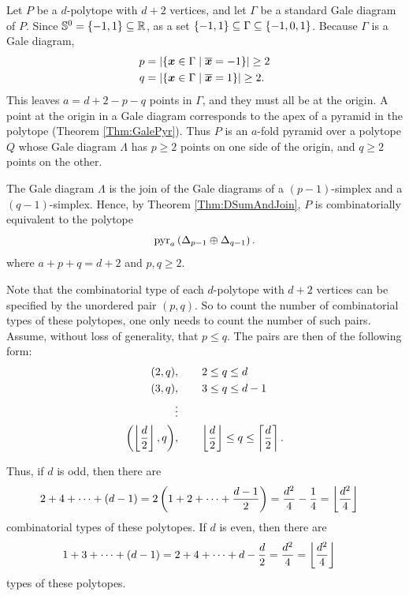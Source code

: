     Let \(P\) be a \(d\)-polytope with \(d+2\) vertices, and let \(\Gamma\) be a standard Gale diagram of \(P\).  Since \(\mathbb{S}^{0}=\left\{-1,1\right\}\subseteq\mathbb{R}\), as a set \(\left\{-1,1\right\}\subseteq\Gamma\subseteq\left\{-1,0,1\right\}\).  Because \(\Gamma\) is a Gale diagram,
        \begin{align*}
            p
                &=  \card{\setb{\ve x\in\Gamma}{\ol{\ve x}=-1}}
                    \ge 2\\
            q
                &=  \card{\setb{\ve x\in\Gamma}{\ol{\ve x}=1}}
                    \ge 2.
        \end{align*}
    This leaves \(a=d+2-p-q\) points in \(\Gamma\), and they must all be at the origin.  A point at the origin in a Gale diagram corresponds to the apex of a pyramid in the polytope (Theorem \ref{Thm:GalePyr}).  Thus \(P\) is an \(a\)-fold pyramid over a polytope \(Q\) whose Gale diagram \(\Lambda\) has \(p\ge 2\) points on one side of the origin, and \(q\ge 2\) points on the other.

    The Gale diagram \(\Lambda\) is the join of the Gale diagrams of a \((p-1)\)-simplex and a \((q-1)\)-simplex.  Hence, by Theorem \ref{Thm:DSumAndJoin}, \(P\) is combinatorially equivalent to the polytope
        \[
            \operatorname{pyr}_a\left(\Delta_{p-1}\oplus\Delta_{q-1}\right).
        \]
    where \(a+p+q=d+2\) and \(p,q\ge 2\).

    Note that the combinatorial type of each \(d\)-polytope with \(d+2\) vertices can be specified by the unordered pair \((p,q)\).  So to count the number of combinatorial types of these polytopes, one only needs to count the number of such pairs.  Assume, without loss of generality, that \(p\le q\).  The pairs are then of the following form:
        \begin{align*}
            (2,q)
                &,\qquad 2\le q\le d\\
            (3,q)
                &,\qquad 3\le q\le d-1\\
                &\vdots\\
            \left(\left\lfloor\frac d2\right\rfloor,q\right)
                &,\qquad \left\lfloor\frac d2\right\rfloor\le q\le\left\lceil\frac d2\right\rceil.
        \end{align*}

    Thus, if \(d\) is odd, then there are
        \begin{align*}
            2+4+\dotsb+(d-1)
                &=  2\left(1+2+\dotsb+\frac{d-1}2\right)
                =   \frac{d^2}4-\frac14
                =   \left\lfloor\frac{d^2}4\right\rfloor
        \end{align*}
    combinatorial types of these polytopes.  If \(d\) is even, then there are
        \begin{align*}
            1+3+\dotsb+(d-1)
                &=  2+4+\dotsb+d-\frac d2
                =   \frac{d^2}4
                =   \left\lfloor\frac{d^2}4\right\rfloor
        \end{align*}
    types of these polytopes.

